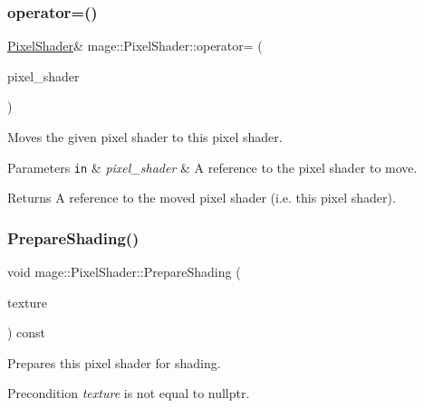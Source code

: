 \subsubsection{\texorpdfstring{operator=()}{operator=()}\hspace{0.1cm}{\footnotesize\ttfamily [2/2]}}
{\footnotesize\ttfamily \hyperlink{classmage_1_1_pixel_shader}{Pixel\+Shader}\& mage\+::\+Pixel\+Shader\+::operator= (\begin{DoxyParamCaption}\item[{\hyperlink{classmage_1_1_pixel_shader}{Pixel\+Shader} \&\&}]{pixel\+\_\+shader }\end{DoxyParamCaption})\hspace{0.3cm}{\ttfamily [delete]}}

Moves the given pixel shader to this pixel shader.


\begin{DoxyParams}[1]{Parameters}
\mbox{\tt in}  & {\em pixel\+\_\+shader} & A reference to the pixel shader to move. \\
\hline
\end{DoxyParams}
\begin{DoxyReturn}{Returns}
A reference to the moved pixel shader (i.\+e. this pixel shader). 
\end{DoxyReturn}
\hypertarget{classmage_1_1_pixel_shader_ab677013145ca252c57e5a001134c01ff}{}\label{classmage_1_1_pixel_shader_ab677013145ca252c57e5a001134c01ff} 
\subsubsection{\texorpdfstring{Prepare\+Shading()}{PrepareShading()}\hspace{0.1cm}{\footnotesize\ttfamily [1/2]}}
{\footnotesize\ttfamily void mage\+::\+Pixel\+Shader\+::\+Prepare\+Shading (\begin{DoxyParamCaption}\item[{I\+D3\+D11\+Shader\+Resource\+View $\ast$}]{texture }\end{DoxyParamCaption}) const\hspace{0.3cm}{\ttfamily [virtual]}}

Prepares this pixel shader for shading.

\begin{DoxyPrecond}{Precondition}
{\itshape texture} is not equal to {\ttfamily nullptr}. 
\end{DoxyPrecond}

